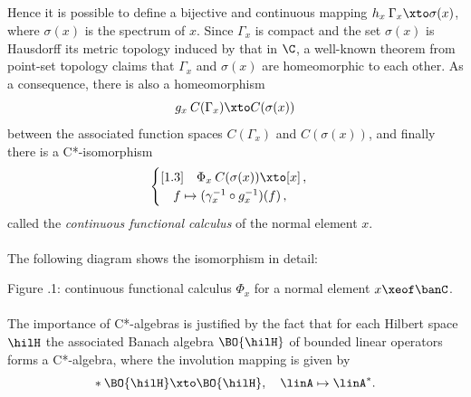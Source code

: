 \documentclass[11pt,twoside]{article}
\renewcommand\thesection{\arabic{section}}
\begin{document}
\subparagraph{}
Hence it is possible to define a bijective and continuous mapping
$h_x \: \Gamma_x \xto \sigma(x)$,
where $\sigma(x)$ is the spectrum of $x$.
Since $\Gamma_x$ is compact and the set $\sigma(x)$ is Hausdorff
{\wrt} its metric topology induced by that in $\C$,
a well-known theorem from point-set topology claims
that $\Gamma_x$ and $\sigma(x)$ are homeomorphic to each other.
As a consequence,
there is also a homeomorphism
\[
g_x \: C(\Gamma_{x}) \xto C(\sigma(x))
\]
between the associated function spaces $C(\Gamma_{x})$ and $C(\sigma(x))$,
and finally there is a C*-isomorphism
\[
\begin{cases}[1.3]
\quad \Phi_{x} \: C(\sigma(x)) \xto [x]\,,\\
\quad f \mapsto (\gamma_x^{-1} \circ g_x^{-1})(f)\,,\\
\end{cases}
\]
called the \textit{continuous functional calculus} of the normal element $x$.

\paragraph{}
The following diagram shows the isomorphism in detail:

\begin{center}
\scalebox{0.9}
{
}

\vspace{3mm}
\footnotesize{Figure \thesection.1:
continuous functional calculus $\Phi_{x}$
for a normal element $x \xeof \banC$.}
\end{center}

\paragraph{} %
The importance of C*-algebras is justified by the fact 
that for each Hilbert space $\hilH$
the associated Banach algebra $\BO{\hilH}$ of bounded linear operators 
forms a C*-algebra, where the involution mapping is given by
\[
* \: \BO{\hilH} \xto \BO{\hilH}, \quad \linA \mapsto \linA^*.
\]
\end{document}
